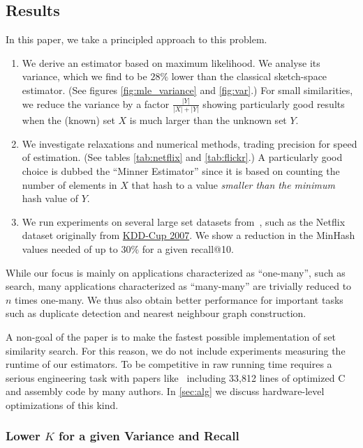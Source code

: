 \subsection{Results}

In this paper, we take a principled approach to this problem.
\begin{enumerate}
   \item We derive an estimator based on maximum likelihood.
      We analyse its variance, which we find to be $28\%$ lower than the classical sketch-space estimator.
      (See figures \ref{fig:mle_variance} and \ref{fig:var}.)
      For small similarities, we reduce the variance by a factor $\frac{|Y|}{|X|+|Y|}$ showing particularly good results when the (known) set $X$ is much larger than the unknown set $Y$.
   \item We investigate relaxations and numerical methods, trading precision for speed of estimation. (See tables \ref{tab:netflix} and \ref{tab:flickr}.)
      A particularly good choice is dubbed the ``Minner Estimator'' since it is based on counting the number of elements in $X$ that hash to a value \emph{smaller than the minimum} hash value of $Y$.
   \item We run experiments on several large set datasets from~\cite{mann2016empirical},
      such as the Netflix dataset originally from \href{https://www.cs.uic.edu/~liub/Netflix-KDD-Cup-2007.html}{KDD-Cup 2007}.
      We show a reduction in the MinHash values needed of up to 30\% for a given recall@10.
\end{enumerate}

While our focus is mainly on applications characterized as ``one-many'', such as search, many applications characterized as ``many-many'' are trivially reduced to $n$ times one-many.
We thus also obtain better performance for important tasks such as duplicate detection and nearest neighbour graph construction.

A non-goal of the paper is to make the fastest possible implementation of set similarity search.
For this reason, we do not include experiments measuring the runtime of our estimators.
To be competitive in raw running time requires a serious engineering task with papers like~\cite{guo2020accelerating} including 33,812 lines of optimized C and assembly code by many authors.
In \cref{sec:alg} we discuss hardware-level optimizations of this kind.

\subsubsection{Lower $K$ for a given Variance and Recall}

